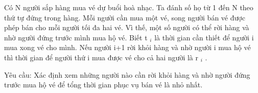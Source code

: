 Có N người sắp hàng mua vé dự buổi hoà nhạc. Ta đánh số họ từ 1 đến N theo thứ tự   đứng trong hàng. Mỗi người cần mua một vé, song người bán vé được phép bán cho mỗi   người tối đa hai vé. Vì thế, một số người có thể rời hàng và nhờ người đứng trước mình mua   hộ vé. Biết t   $_    i   $   là thời gian cần thiết để người i mua xong vé cho mình. Nếu người   i+1 rời khỏi hàng và nhờ người i mua hộ vé thì thời gian để người thứ i mua được vé cho cả   hai người là r   $_    i   $   .  

   Yêu cầu: Xác định xem những người nào cần rời khỏi hàng và nhờ người đứng trước mua   hộ vé để tổng thời gian phục vụ bán vé là nhỏ nhất.